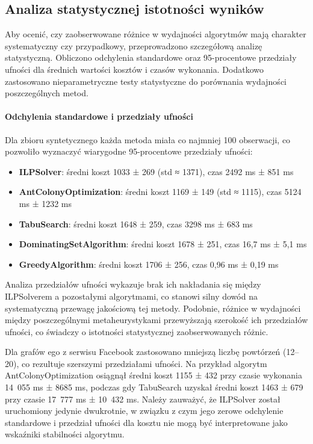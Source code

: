 \subsection{Analiza statystycznej istotności wyników}

Aby ocenić, czy zaobserwowane różnice w wydajności algorytmów mają charakter systematyczny czy przypadkowy, przeprowadzono szczegółową analizę statystyczną. Obliczono odchylenia standardowe oraz 95-procentowe przedziały ufności dla średnich wartości kosztów i czasów wykonania. Dodatkowo zastosowano nieparametryczne testy statystyczne do porównania wydajności poszczególnych metod.

\paragraph{Odchylenia standardowe i przedziały ufności}

Dla zbioru syntetycznego każda metoda miała co najmniej 100 obserwacji, co pozwoliło wyznaczyć wiarygodne 95-procentowe przedziały ufności:

\begin{itemize}
\item \textbf{ILPSolver}: średni koszt 1033 ± 269 (std ≈ 1371), czas 2492 ms ± 851 ms
\item \textbf{AntColonyOptimization}: średni koszt 1169 ± 149 (std ≈ 1115), czas 5124 ms ± 1232 ms
\item \textbf{TabuSearch}: średni koszt 1648 ± 259, czas 3298 ms ± 683 ms
\item \textbf{DominatingSetAlgorithm}: średni koszt 1678 ± 251, czas 16,7 ms ± 5,1 ms
\item \textbf{GreedyAlgorithm}: średni koszt 1706 ± 256, czas 0,96 ms ± 0,19 ms
\end{itemize}

Analiza przedziałów ufności wykazuje brak ich nakładania się między ILPSolverem a pozostałymi algorytmami, co stanowi silny dowód na systematyczną przewagę jakościową tej metody. Podobnie, różnice w wydajności między poszczególnymi metaheurystykami przewyższają szerokość ich przedziałów ufności, co świadczy o istotności statystycznej zaobserwowanych różnic.

Dla grafów ego z serwisu Facebook zastosowano mniejszą liczbę powtórzeń (12--20), co rezultuje szerszymi przedziałami ufności. Na przykład algorytm AntColonyOptimization osiągnął średni koszt 1155 ± 432 przy czasie wykonania 14~055 ms ± 8685 ms, podczas gdy TabuSearch uzyskał średni koszt 1463 ± 679 przy czasie 17~777 ms ± 10~432 ms. Należy zauważyć, że ILPSolver został uruchomiony jedynie dwukrotnie, w związku z czym jego zerowe odchylenie standardowe i przedział ufności dla kosztu nie mogą być interpretowane jako wskaźniki stabilności algorytmu.

